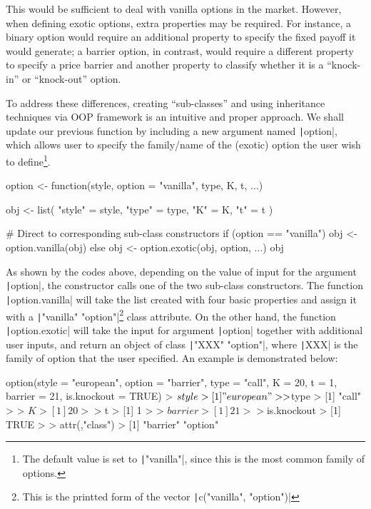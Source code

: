 This would be sufficient to deal with vanilla options in the market. However, when defining exotic options, extra properties may be required. For instance, a binary option would require an additional property to specify the fixed payoff it would generate; a barrier option, in contrast, would require a different property to specify a price barrier and another property to classify whether it is a ``knock-in'' or ``knock-out'' option.

To address these differences, creating ``sub-classes'' and using inheritance techniques via OOP framework is an intuitive and proper approach. We shall update our previous function by including a new argument named \texttt|option|, which allows user to specify the family/name of the (exotic) option the user wish to define\footnote{The default value is set to \texttt|"vanilla"|, since this is the most common family of options.}.

\begin{Rminted}
option <- function(style, option = "vanilla", type, K, t, ...) {

    obj <- list(
        "style" = style,
        "type" = type,
        "K" = K,
        "t" = t
    )

    # Direct to corresponding sub-class constructors
    if (option == "vanilla") {
        obj <- option.vanilla(obj)
    } else {
        obj <- option.exotic(obj, option, ...)
    }
    obj
}
\end{Rminted}

As shown by the codes above, depending on the value of input for the argument \texttt|option|, the constructor calls one of the two sub-class constructors. The function \texttt|option.vanilla| will take the list created with four basic properties and assign it with a \texttt|"vanilla" "option"|\footnote{This is the printted form of the vector \texttt|c("vanilla", "option")|} class attribute. On the other hand, the function \texttt|option.exotic| will take the input for argument \texttt|option| together with additional user inputs, and return an object of class \texttt|"XXX" "option"|, where \texttt|XXX| is the family of option that the user specified. An example is demonstrated below:

\begin{Rminted}
option(style = "european",
       option = "barrier",
       type = "call",
       K = 20,
       t = 1,
       barrier = 21,
       is.knockout = TRUE)
> $style
> [1] "european"
> 
> $type
> [1] "call"
> 
> $K
> [1] 20
> 
> $t
> [1] 1
> 
> $barrier
> [1] 21
> 
> $is.knockout
> [1] TRUE
> 
> attr(,"class")
> [1] "barrier" "option"
\end{Rminted}

